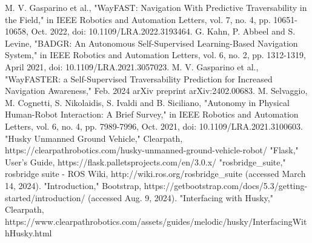 \documentclass[letterpaper, 10 pt, conference]{ieeeconf}  %
\begin{document}










\begin{thebibliography}{99}

 M. V. Gasparino et al., "WayFAST: Navigation With Predictive Traversability in the Field," in IEEE Robotics and Automation Letters, vol. 7, no. 4, pp. 10651-10658, Oct. 2022, doi: 10.1109/LRA.2022.3193464.
 G. Kahn, P. Abbeel and S. Levine, "BADGR: An Autonomous Self-Supervised Learning-Based Navigation System," in IEEE Robotics and Automation Letters, vol. 6, no. 2, pp. 1312-1319, April 2021, doi: 10.1109/LRA.2021.3057023.
 M. V. Gasparino et al., "WayFASTER: a Self-Supervised Traversability Prediction for Increased Navigation Awareness," Feb. 2024 arXiv preprint arXiv:2402.00683.
 M. Selvaggio, M. Cognetti, S. Nikolaidis, S. Ivaldi and B. Siciliano, "Autonomy in Physical Human-Robot Interaction: A Brief Survey," in IEEE Robotics and Automation Letters, vol. 6, no. 4, pp. 7989-7996, Oct. 2021, doi: 10.1109/LRA.2021.3100603.
"Husky Unmanned Ground Vehicle," Clearpath, https://clearpathrobotics.com/husky-unmanned-ground-vehicle-robot/
"Flask," User’s Guide, https://flask.palletsprojects.com/en/3.0.x/
"rosbridge\_suite," rosbridge suite - ROS Wiki, http://wiki.ros.org/rosbridge\_suite (accessed March 14, 2024).
"Introduction," Bootstrap, https://getbootstrap.com/docs/5.3/getting-started/introduction/ (accessed Aug. 9, 2024).
"Interfacing with Husky," Clearpath, https://www.clearpathrobotics.com/assets/guides/melodic/husky/InterfacingWithHusky.html






\end{thebibliography}
\end{document}
